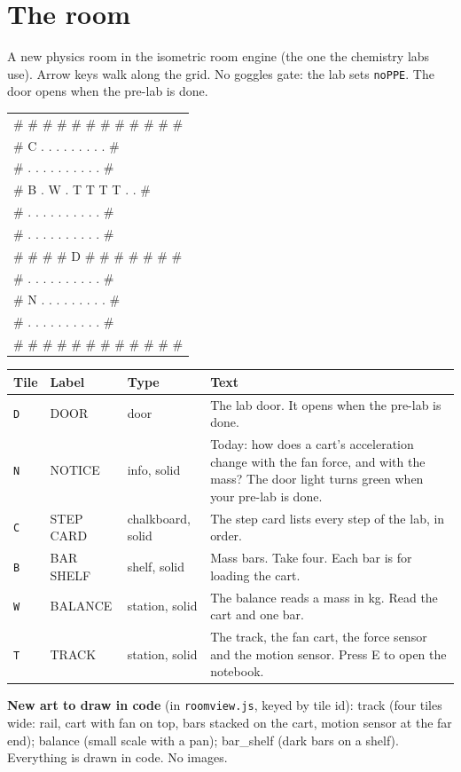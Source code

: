 \documentclass[10pt]{article}
\begin{document}
\section{The room}
A new physics room in the isometric room engine (the one the chemistry labs use). Arrow keys walk along the grid. No goggles gate: the lab sets \texttt{noPPE}. The door opens when the pre-lab is done.
\begin{center}\ttfamily\small\begin{tabular}{@{}l@{}}\# \# \# \# \# \# \# \# \# \# \# \#\\
\# C . . . . . . . . . \#\\
\# . . . . . . . . . . \#\\
\# B . W . T T T T . . \#\\
\# . . . . . . . . . . \#\\
\# . . . . . . . . . . \#\\
\# \# \# \# D \# \# \# \# \# \# \#\\
\# . . . . . . . . . . \#\\
\# N . . . . . . . . . \#\\
\# . . . . . . . . . . \#\\
\# \# \# \# \# \# \# \# \# \# \# \#\end{tabular}\end{center}
\begin{tabularx}{\linewidth}{@{}l l l Y@{}}\toprule \textbf{Tile} & \textbf{Label} & \textbf{Type} & \textbf{Text}\\\midrule
\texttt{D} & DOOR & door & The lab door. It opens when the pre-lab is done. \\
\texttt{N} & NOTICE & info, solid & Today: how does a cart's acceleration change with the fan force, and with the mass? The door light turns green when your pre-lab is done. \\
\texttt{C} & STEP CARD & chalkboard, solid & The step card lists every step of the lab, in order. \\
\texttt{B} & BAR SHELF & shelf, solid & Mass bars. Take four. Each bar is for loading the cart. \\
\texttt{W} & BALANCE & station, solid & The balance reads a mass in kg. Read the cart and one bar. \\
\texttt{T} & TRACK & station, solid & The track, the fan cart, the force sensor and the motion sensor. Press E to open the notebook. \\
\bottomrule\end{tabularx}
\textbf{New art to draw in code} (in \texttt{roomview.js}, keyed by tile id): track (four tiles wide: rail, cart with fan on top, bars stacked on the cart, motion sensor at the far end); balance (small scale with a pan); bar\_shelf (dark bars on a shelf). Everything is drawn in code. No images.
\end{document}
